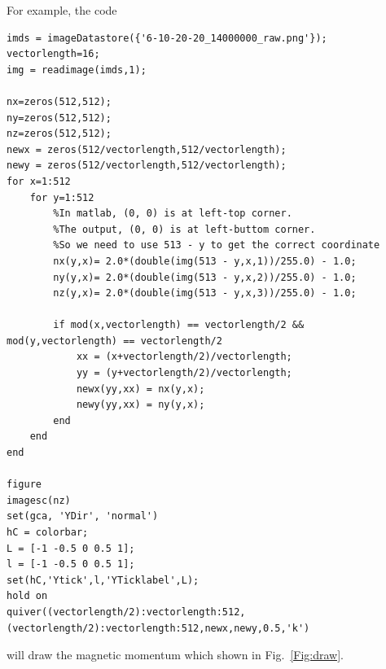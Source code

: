 \documentclass[aps,superscriptaddress,groupedaddress]{revtex4}  %
\begin{document}
For example, the code
\begin{lstlisting}
imds = imageDatastore({'6-10-20-20_14000000_raw.png'});
vectorlength=16;
img = readimage(imds,1);

nx=zeros(512,512);
ny=zeros(512,512);
nz=zeros(512,512);
newx = zeros(512/vectorlength,512/vectorlength);
newy = zeros(512/vectorlength,512/vectorlength);
for x=1:512
    for y=1:512
        %In matlab, (0, 0) is at left-top corner.
        %The output, (0, 0) is at left-buttom corner.
        %So we need to use 513 - y to get the correct coordinate
        nx(y,x)= 2.0*(double(img(513 - y,x,1))/255.0) - 1.0;
        ny(y,x)= 2.0*(double(img(513 - y,x,2))/255.0) - 1.0;
        nz(y,x)= 2.0*(double(img(513 - y,x,3))/255.0) - 1.0;

        if mod(x,vectorlength) == vectorlength/2 &&  mod(y,vectorlength) == vectorlength/2
            xx = (x+vectorlength/2)/vectorlength;
            yy = (y+vectorlength/2)/vectorlength;
            newx(yy,xx) = nx(y,x);
            newy(yy,xx) = ny(y,x);
        end
    end
end

figure
imagesc(nz)
set(gca, 'YDir', 'normal')
hC = colorbar;
L = [-1 -0.5 0 0.5 1];
l = [-1 -0.5 0 0.5 1];
set(hC,'Ytick',l,'YTicklabel',L);
hold on
quiver((vectorlength/2):vectorlength:512,(vectorlength/2):vectorlength:512,newx,newy,0.5,'k')
\end{lstlisting}
will draw the magnetic momentum which shown in Fig.~\ref{Fig:draw}.
\end{document}
